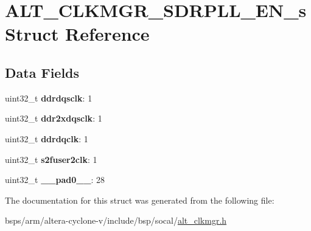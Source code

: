 \hypertarget{structALT__CLKMGR__SDRPLL__EN__s}{}\section{A\+L\+T\+\_\+\+C\+L\+K\+M\+G\+R\+\_\+\+S\+D\+R\+P\+L\+L\+\_\+\+E\+N\+\_\+s Struct Reference}
\label{structALT__CLKMGR__SDRPLL__EN__s}
\subsection*{Data Fields}
\begin{DoxyCompactItemize}
\item 
\mbox{\label{structALT__CLKMGR__SDRPLL__EN__s_a92edf83f6178ca611198bebd4e3e4812}} 
uint32\+\_\+t {\bfseries ddrdqsclk}\+: 1
\item 
\mbox{\label{structALT__CLKMGR__SDRPLL__EN__s_a1b2658f6ec8a37485c5cbfe2b9501344}} 
uint32\+\_\+t {\bfseries ddr2xdqsclk}\+: 1
\item 
\mbox{\label{structALT__CLKMGR__SDRPLL__EN__s_a0fe3ba1e029b092c79e2ef0188fc4e13}} 
uint32\+\_\+t {\bfseries ddrdqclk}\+: 1
\item 
\mbox{\label{structALT__CLKMGR__SDRPLL__EN__s_a9ec75a12028ad887d7fc3d40390e6f70}} 
uint32\+\_\+t {\bfseries s2fuser2clk}\+: 1
\item 
\mbox{\label{structALT__CLKMGR__SDRPLL__EN__s_a3530c202fce442edd0a1e102de30953f}} 
uint32\+\_\+t {\bfseries \+\_\+\+\_\+pad0\+\_\+\+\_\+}\+: 28
\end{DoxyCompactItemize}


The documentation for this struct was generated from the following file\+:\begin{DoxyCompactItemize}
\item 
bsps/arm/altera-\/cyclone-\/v/include/bsp/socal/\mbox{\hyperlink{alt__clkmgr_8h}{alt\+\_\+clkmgr.\+h}}\end{DoxyCompactItemize}
